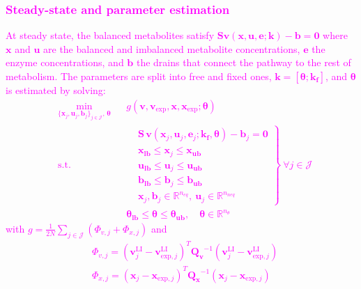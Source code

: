 \documentclass[conference]{IEEEtran}
\begin{document}
\subsubsection{\textcolor{magenta}{Steady-state and parameter estimation}}
\textcolor{magenta}{At steady state, the balanced metabolites satisfy $ \mathbf{S}\mathbf{v}(\mathbf{x}, \mathbf{u}, \mathbf{e};\mathbf{k}) - \mathbf{b} = \mathbf{0}$
where $\mathbf{x}$ and $\mathbf{u}$ are the balanced and imbalanced metabolite concentrations, $\mathbf{e}$ the enzyme concentrations, and $\mathbf{b}$ the drains that connect the pathway to the rest of metabolism. The parameters are split into free and fixed ones, $\mathbf{k} = \left[\boldsymbol{\theta}; \mathbf{k_f}\right]$, and $\boldsymbol{\theta}$ is estimated by solving:
\begin{align}
    &\min_{\{\mathbf{x}_j,\mathbf{u}_j,\mathbf{b}_j\}_{j\in\mathcal{J}},\, \boldsymbol{\theta}}
    && g(\mathbf{v}, {\mathbf{v}_{\text{exp}}} , \mathbf{x}, {\mathbf{x}_\text{exp}}; \boldsymbol{\theta}) \label{eqn: SS_comp_params}\\
    &\text{s.t.}
    &&\left.
    \begin{aligned}
        &\mathbf{S}\,\mathbf{v}(\mathbf{x}_j,\mathbf{u}_j,\mathbf{e}_j;\mathbf{k_f},\boldsymbol{\theta})-\mathbf{b}_j=\mathbf{0}\\
        &\mathbf{x_{lb}}\leq\mathbf{x}_j\leq\mathbf{x_{ub}}\\
        &\mathbf{u_{lb}}\leq\mathbf{u}_j\leq\mathbf{u_{ub}}\\
        &\mathbf{b_{lb}}\leq\mathbf{b}_j\leq\mathbf{b_{ub}}\\
        &\mathbf{x}_j,\mathbf{b}_j\in\mathbb{R}^{n_{eq}},\ \mathbf{u}_j\in\mathbb{R}^{n_{neq}}
    \end{aligned}
    \right\}\ \forall j\in\mathcal{J} \nonumber\\
    & && \boldsymbol{\theta_{lb}}\leq\boldsymbol{\theta}\leq\boldsymbol{\theta_{ub}},\quad \boldsymbol{\theta}\in\mathbb{R}^{n_{\theta}}\nonumber
\end{align}
with $g = \frac{1}{2N}\sum_{j\in \mathcal{J}}(\Phi_{v,j}+\Phi_{x,j})$ and
\begin{align}
    &\Phi_{v,j} = (\mathbf{v}^{\text{LI}}_{j} -\mathbf{v}^{\text{LI}}_{\text{exp},j})^T\mathbf{Q_v}^{-1} (\mathbf{v}^{\text{LI}}_{j} - \mathbf{v}^{\text{LI}}_{\text{exp},j}) \\
    &\Phi_{x,j} = (\mathbf{x}_{j} -\mathbf{x}_{\text{exp},j})^T\mathbf{Q_x}^{-1} (\mathbf{x}_{j} - \mathbf{x}_{\text{exp},j})
\end{align}
}
\end{document}
